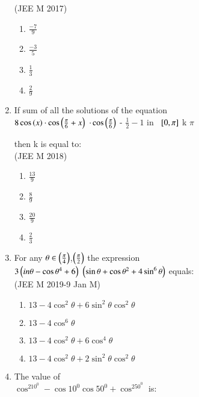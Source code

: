 \documentclass[journal,10pt,twocolumn]{IEEEtran}
\theoremstyle{remark}
\begin{document}
\begin{enumerate}[start=14]
\hfill{(JEE M 2017)}\\
    \begin{enumerate}
    \item $\frac{-7}{9}$ 
    \item $\frac{-3}{5}$
    \item $\frac{1}{3}$
    \item $\frac{2}{9}$\\
    \end{enumerate}
 \item If sum of all the solutions of the equation\\
  $8 \cos\left(x\right) \cdot \cos\left(\frac{\pi}{6} + x \right)$ $\cdot \cos \left(\frac{\pi}{6}\right)$ - $\frac{1}{2} - 1 \text{ in }$ ${}\left[0, \pi\right]$ k $\pi$

 then k is equal to:\\
 
\hfill{(JEE M 2018)}\\
\begin{enumerate}
\item $\frac{13}{9}$
\item $\frac{8}{9}$\\
\item  $\frac{20}{9}$
\item  $\frac{2}{3}$\\
\end{enumerate}
  \item For any $\theta \in \left(\frac{\pi}{4}\right)$,$\left(\frac{\pi}{2}\right)$ the expression\\
 $3\left(in\theta-\cos\theta^4 +6\right)$ $\left(\sin\theta+\cos\theta^2 +4\sin^{6}\theta\right)$ equals:\\
 
\hfill {(JEE M 2019-9 Jan  M)}\\
 \begin{enumerate}
 \item $13-4\cos^2\theta +6\sin^2\theta \cos^2\theta $\\
 \item  $13-4\cos^6\theta$\\
\item  $13-4\cos^2\theta +6\cos^4\theta$\\
 \item $13-4\cos^2\theta +2\sin^2\theta \cos^2\theta$\\
 \end{enumerate}
\item The value of\\ $\cos^210^{0}-\cos10^{0}\cos50^{0}+\cos^250^{0}$ is:\\


\end{enumerate}
\end{document}
